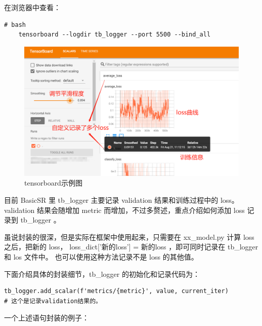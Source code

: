 \documentclass[../main.tex]{subfiles}
\begin{document}
在浏览器中查看：
\begin{verbatim}
# bash
    tensorboard --logdir tb_logger --port 5500 --bind_all
\end{verbatim}

\begin{figure}[h]
    \begin{center}
        \includegraphics[width=0.8\linewidth]{figures/tensorboard_demo.png}
        \caption{tensorboard示例图}
        \label{fig:tensorboard_demo}
    \end{center}
\end{figure}

目前 BasicSR 里 tb\_logger 主要记录 validation 结果和训练过程中的 loss。validation 结果会随增加 metric 而增加，不过多赘述，重点介绍如何添加 loss 记录到 tb\_logger 。

\begin{hl} %
    虽说封装的很深，但是实际在框架中使用起来，只需要在 xx\_model.py 计算 loss 之后，把新的 loss， loss\_dict['新的loss'] = 新的loss ，即可同时记录在 tb\_logger 和 los 文件中。
    也可以使用这种方法记录不是 loss 的其他值。
\end{hl}

下面介绍具体的封装细节，tb\_logger 的初始化和记录代码为：

\begin{verbatim}
tb_logger.add_scalar(f'metrics/{metric}', value, current_iter)
# 这个是记录validation结果的。
\end{verbatim}

一个上述语句封装的例子：
\end{document}
